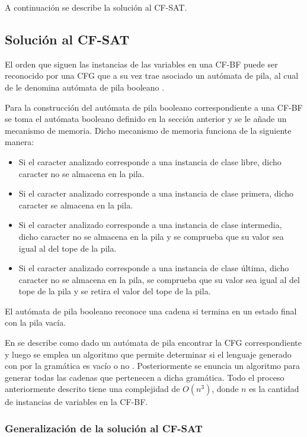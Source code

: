 \documentclass[12pt]{article}
\begin{document}
A continuación se describe la solución al CF-SAT.

\subsection{Solución al CF-SAT}

El orden que siguen las instancias de las variables en una CF-BF puede ser reconocido por una CFG que a su vez trae asociado
un autómata de pila, al cual de le denomina autómata de pila booleano \cite{aCFSAT}.

Para la construcción del autómata de pila booleano correspondiente a una CF-BF se toma el autómata booleano definido en
la sección anterior y se le añade un mecanismo de memoria. Dicho mecanismo de memoria funciona de la siguiente manera:

\begin{itemize}
      \item Si el caracter analizado corresponde a una instancia de clase libre, dicho caracter no se almacena en la pila.
      \item Si el caracter analizado corresponde a una instancia de clase primera, dicho caracter se almacena en la pila.
      \item Si el caracter analizado corresponde a una instancia de clase intermedia, dicho caracter no se almacena en la
            pila y se comprueba que su valor sea igual al del tope de la pila.
      \item Si el caracter analizado corresponde a una instancia de clase última, dicho caracter no se almacena en la
            pila, se comprueba que su valor sea igual al del tope de la pila y se retira el valor del tope de la pila.
\end{itemize}
El autómata de pila booleano reconoce una cadena si termina en un estado final con la pila vacía.

En \cite{aCFSAT} se describe como dado un autómata de pila encontrar la CFG correspondiente y luego 
se emplea un algoritmo que permite determinar si el lenguaje generado con por la gramática es vacío o no \cite{authomataTheory}. Posteriormente 
se enuncia un algoritmo para generar todas las cadenas que pertenecen a dicha gramática. Todo el proceso anteriormente descrito tiene una complejidad de $O(n^3)$, donde $n$
es la cantidad de instancias de variables en la CF-BF.


\subsubsection{Generalización de la solución al CF-SAT}
\end{document}
